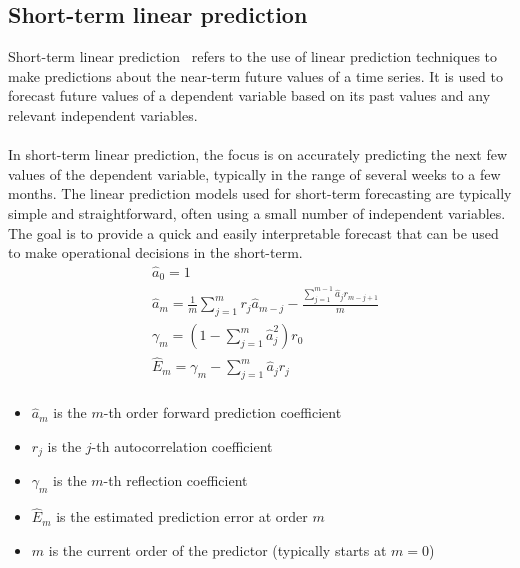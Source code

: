         

    \subsection{Short-term linear prediction} \label{subsec:shortlp}

    Short-term linear prediction~\cite{Riahy} refers to the use of linear prediction techniques to make predictions about the near-term
    future values of a time series.
    It is used to forecast future values of a dependent variable based on its past values and any relevant independent variables.\\
    \\
    In short-term linear prediction, the focus is on accurately predicting the next few values of the dependent variable, typically in the range of
    several weeks to a few months. The linear prediction models used for short-term forecasting are typically simple and straightforward, often
    using a small number of independent variables. The goal is to provide a quick and easily interpretable forecast that can be used to make operational
    decisions in the short-term.\\
    \begin{equation} \label{eq:slpmain}
        \begin{aligned}
            &\hat{a}_0 = 1 \\
            &\hat{a}_m = \frac{1}{m} \sum_{j=1}^{m} r_j \hat{a}_{m-j} - \frac{\sum_{j=1}^{m-1} \hat{a}_j r_{m-j+1}}{m} \\
            &\gamma_m = (1 - \sum_{j=1}^{m} \hat{a}_j^2) r_0 \\
            &\hat{E}_m = \gamma_m - \sum_{j=1}^{m} \hat{a}_j r_{j} \\
        \end{aligned}
    \end{equation}
    \begin{itemize}
        \item $\hat{a}_m$ is the $m$-th order forward prediction coefficient
        \item $r_j$ is the $j$-th autocorrelation coefficient
        \item $\gamma_m$ is the $m$-th reflection coefficient
        \item $\hat{E}_m$ is the estimated prediction error at order $m$
        \item $m$ is the current order of the predictor (typically starts at $m=0$)
    \end{itemize}


